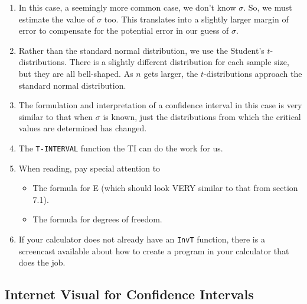 \documentclass{ccg-topic}
\begin{document}
\begin{enumerate}

    \item In this case, a seemingly more common case, we don’t know $\sigma$. So, we must estimate the value of $\sigma$ too. This translates into a slightly larger margin of error to compensate for the potential error in our guess of $\sigma$.
    
    \item Rather than the standard normal distribution, we use the Student's $t$-distributions. There is a slightly different distribution for each sample size, but they are all bell-shaped.  As $n$ gets larger, the $t$-distributions approach the standard normal distribution.
    
    \item The formulation and interpretation of a confidence interval in this case is very similar to that when $\sigma$ is known, just the distributions from which the critical values are determined has changed.
    
    \item The \texttt{T-INTERVAL} function the TI can do the work for us.
    
    \item When reading, pay special attention to
    
        \begin{itemize}
        
            \item The formula for E (which should look VERY similar to that from section 7.1).
            
            \item The formula for degrees of freedom.
            
        \end{itemize}
        
    \item If your calculator does not already have an \texttt{InvT} function, there is a screencast available about how to create a program in your calculator that does the job.
    
\end{enumerate}

\subsection*{Internet Visual for Confidence Intervals}
\end{document}
